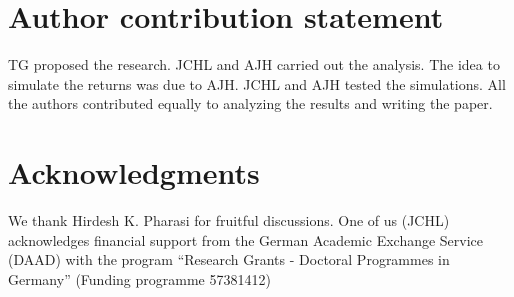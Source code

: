 \section{Author contribution statement}

TG proposed the research. JCHL and AJH carried out the analysis. The idea to
simulate the returns was due to AJH. JCHL and AJH tested the simulations. All
the authors contributed equally to analyzing the results and writing the paper.

\section*{Acknowledgments}

We thank Hirdesh K. Pharasi for fruitful discussions. One of us (JCHL)
acknowledges financial support from the German Academic Exchange Service
(DAAD) with the program ``Research Grants - Doctoral Programmes in Germany''
(Funding programme 57381412)


